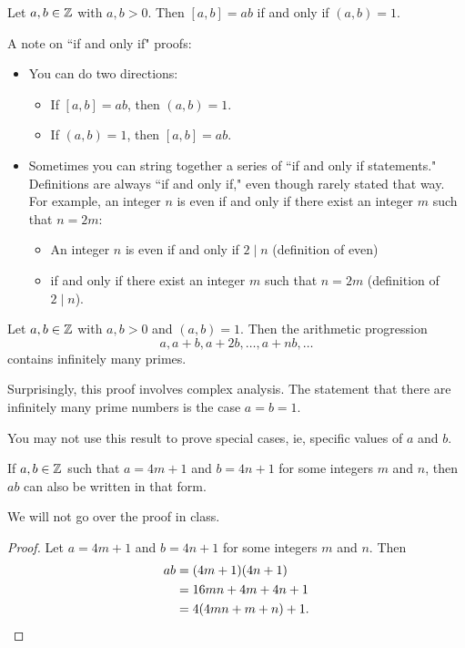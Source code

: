 \documentclass{ximera}
\begin{document}
\begin{corollary}[Corollary 1.20]\label{cor:lcm-gcd}
 Let $a,b\in\mathbb Z$ with $a,b>0$. Then $[a,b]=ab$ if and only if $(a,b)=1$.
\end{corollary}
A note on ``if and only if" proofs: 
\begin{itemize}
 \item You can do two directions: 
\begin{itemize}
 \item  If $[a,b]=ab$, then $(a,b)=1$.
 \item  If $(a,b)=1$, then $[a,b]=ab$.
\end{itemize}
\item Sometimes you can string together a series of ``if and only if statements." Definitions are always ``if and only if," even though rarely stated that way. For example, an integer $n$ is even if and only if there exist an integer $m$ such that $n=2m$:
\begin{itemize}
 \item An integer $n$ is even if and only if $2\mid n$ (definition of even) 
 \item if and only if there exist an integer $m$ such that $n=2m$ (definition of $2\mid n$).
\end{itemize}
\end{itemize}

\begin{theorem}\label{thm:dirichlet}
 Let $a,b\in\mathbb Z$ with $a,b>0$ and $(a,b)=1$. Then the arithmetic progression \[a,a+b, a+2b, \dots, a+nb,\dots\]
 contains infinitely many primes.
\end{theorem}
Surprisingly, this proof involves complex analysis. The statement that there are infinitely many prime numbers is the case $a=b=1$.


\begin{warning}
    You may not use this result to prove special cases, ie, specific values of $a$ and $b$.
\end{warning}


\begin{lemma}[Lemma 1.23]\label{lem:prod-goodprimes}
 If $a,b\in\mathbb Z$ such that $a=4m+1$ and $b=4n+1$ for some integers $m$ and $n$, then $ab$ can also be written in that form.
\end{lemma}
We will not go over the proof in class.
\begin{proof}
 Let $a=4m+1$ and $b=4n+1$ for some integers $m$ and $n$. Then 
\begin{align*}
ab&=(4m+1)(4n+1)\\
&=16mn+4m+4n+1\\
&=4(4mn+m+n)+1.\qedhere
\end{align*}
\end{proof}
\end{document}
